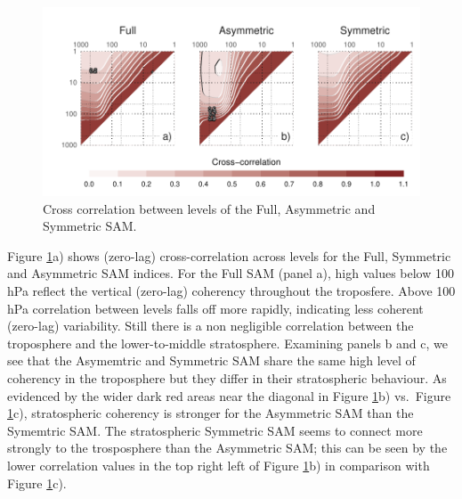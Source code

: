\documentclass[]{ametsocV5}
\begin{document}
\begin{figure}
\includegraphics{cross-correlation-1} \caption[Cross correlation between levels of the Full, Asymmetric and Symmetric SAM]{Cross correlation between levels of the Full, Asymmetric and Symmetric SAM.}\label{fig:cross-correlation}
\end{figure}

Figure \ref{fig:cross-correlation}a) shows (zero-lag) cross-correlation
across levels for the Full, Symmetric and Asymmetric SAM indices. For
the Full SAM (panel a), high values below 100 hPa reflect the vertical
(zero-lag) coherency throughout the troposfere. Above 100 hPa
correlation between levels falls off more rapidly, indicating less
coherent (zero-lag) variability. Still there is a non negligible
correlation between the troposphere and the lower-to-middle
stratosphere. Examining panels b and c, we see that the Asymemtric and
Symmetric SAM share the same high level of coherency in the troposphere
but they differ in their stratospheric behaviour. As evidenced by the
wider dark red areas near the diagonal in Figure
\ref{fig:cross-correlation}b) vs.~Figure \ref{fig:cross-correlation}c),
stratospheric coherency is stronger for the Asymmetric SAM than the
Symemtric SAM. The stratospheric Symmetric SAM seems to connect more
strongly to the trosposphere than the Asymmetric SAM; this can be seen
by the lower correlation values in the top right left of Figure
\ref{fig:cross-correlation}b) in comparison with Figure
\ref{fig:cross-correlation}c).
\end{document}

